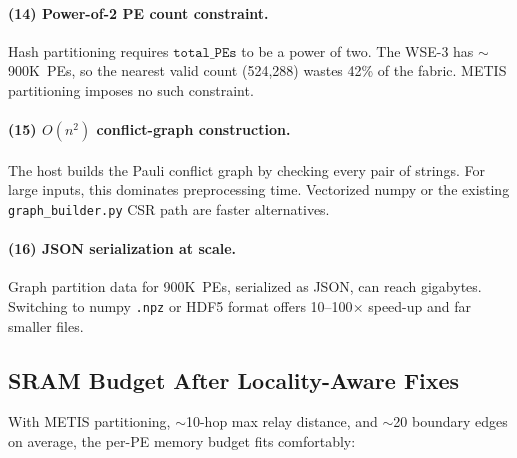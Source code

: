 \documentclass[11pt,letterpaper]{article}
\begin{document}
\paragraph{(14) Power-of-2 PE count constraint.}
Hash partitioning requires $\texttt{total\_PEs}$ to be a power of two.
The WSE-3 has $\sim$900K~PEs,
so the nearest valid count (524{,}288) wastes 42\% of the fabric.
METIS partitioning imposes no such constraint.

\paragraph{(15) $O(n^2)$ conflict-graph construction.}
The host builds the Pauli conflict graph by checking every pair of strings.
For large inputs, this dominates preprocessing time.
Vectorized numpy or the existing \texttt{graph\_builder.py} CSR path are faster alternatives.

\paragraph{(16) JSON serialization at scale.}
Graph partition data for 900K~PEs, serialized as JSON,
can reach gigabytes.
Switching to numpy \texttt{.npz} or HDF5 format
offers 10--100$\times$ speed-up and far smaller files.

\subsection{SRAM Budget After Locality-Aware Fixes}

With METIS partitioning, $\sim$10-hop max relay distance,
and $\sim$20 boundary edges on average, the per-PE memory budget fits comfortably:
\end{document}
